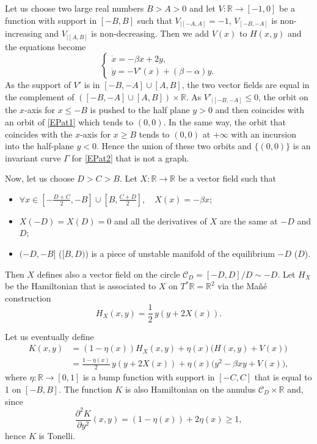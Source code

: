 \documentclass[JEP,XML,SOM,Unicode,published]{cedram}
\theoremstyle{definition}
\def\R{\mathbb{R}}
\begin{document}
Let us choose two large real numbers $B>A>0$ and let $V:\R\to [-1, 0]$ be a function with support in $[-B, B]$ such that $V_{|[-A, A]}=-1$, $V_{[-B, -A]}$ is non-increasing and $V_{|[A, B]}$ is non-decreasing. Then we add $V(x)$ to $H(x,y)$ and the equations become
\begin{equation}\label{EPat2}\begin{cases}
\dot x=-\beta x+2y,\\
\dot y=-V'(x)+(\beta-\alpha) y.
\end{cases}\end{equation}
As the support of $V'$ is in $[-B, -A]\cup [A,B]$, the two vector fields are equal in the complement of $([-B, -A]\cup [A, B])\times \R$. As $V'_{|[-B, -A]}\leq 0$, the orbit on the $x$-axis for $x\leq -B$ is pushed to the half plane $y>0$ and then coincides with an orbit of \eqref{EPat1} which tends to $(0, 0)$. In the same way, the orbit that coincides with the $x$-axis for $x\geq B$ tends to $(0, 0)$ at $+\infty$ with an incursion into the half-plane $y<0$. Hence the union of these two orbits and $\{ (0, 0)\}$ is an invariant curve $\Gamma$ for \eqref{EPat2} that is not a graph.

Now, let us choose $D>C>B$. Let $X:\R\to \R$ be a vector field such that
\begin{itemize}
\item $\forall x\in [-\frac{D+C}{2}, -B]\cup [B, \frac{C+D}{2}],\quad X(x)=-\beta x$;
\item $X(-D)=X(D)=0$ and all the derivatives of $X$ are the same at $-D$ and $D$;
\item $(-D, -B]$ (\resp $[B, D)$) is a piece of unstable manifold of the equilibrium $-D$ (\resp $D$).
\end{itemize}
Then $X$ defines also a vector field on the circle ${\mathcal C}_D=[-D, D]/D\sim -D$. Let $H_X$ be the Hamiltonian that is associated to $X$ on $T^*\R=\R^2$ via the Mañé construction
\[
H_X(x, y)=\frac{1}{2}\,y(y+2X(x)).
\]

Let us eventually define
\begin{align*}
K(x,y)&=(1-\eta (x))H_X(x,y)+\eta(x)\big(H(x,y)+V(x)\big)
\\
&=\frac{1-\eta (x)}{2}\,y(y+2X(x))+\eta(x)\big(y^2-\beta xy+V(x)\big),
\end{align*}
where $\eta:\R\to [0, 1]$ is a bump function with support in $[-C, C]$ that is equal to 1 on $[-B, B]$. The function $K$ is also Hamiltonian on the annulus $ {\mathcal C}_D\times \R$ and, since
\[
\frac{\partial^2K}{\partial y^2}(x, y)=(1-\eta(x))+2\eta(x)\geq 1,
\]
hence $K$ is Tonelli.
\end{document}
